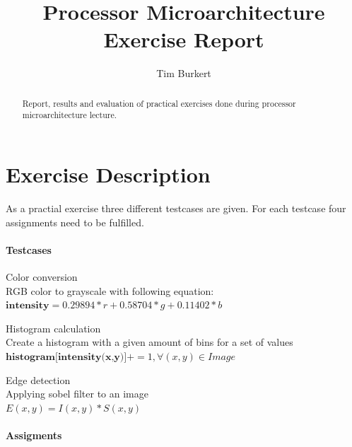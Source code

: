 \documentclass[a4paper]{scrartcl}
\begin{document}
	
	\title{Processor Microarchitecture Exercise Report}
	\author{Tim Burkert}
	
	\maketitle
	
	\begin{abstract}
		Report, results and evaluation of practical exercises done during processor microarchitecture lecture.
	\end{abstract}
	
	\section{Exercise Description}
	As a practial exercise three different testcases are given. For each testcase four assignments need to be fulfilled.
	
	\paragraph{Testcases}
	
	\begin{description}
		\item Color conversion \\
		RGB color to grayscale with following equation: \\
		$\textbf{intensity} = 0.29894*r + 0.58704*g + 0.11402*b$
		
		\item Histogram calculation \\
		Create a histogram with a given amount of bins for a set of values \\
		$\textbf{histogram[intensity(x,y)]} += 1, \forall (x,y) \in Image$
		
		\item Edge detection \\
		Applying sobel filter to an image \\
		$E(x,y) = I(x,y) * S(x,y)$
	\end{description}
	
	\paragraph{Assigments}
	
\end{document}
